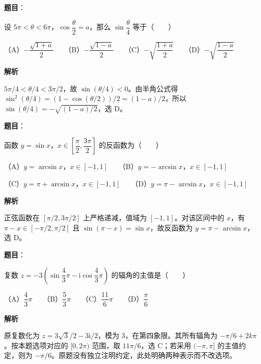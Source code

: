 \begin{answer}

\textbf{题目}：

设 $5\pi<\theta<6\pi$，$\cos\dfrac\theta2=a$，那么 $\sin\dfrac\theta4$ 等于\mbox{（　　）}

（A）$-\dfrac{\sqrt{1+a}}2$　　（B）$-\dfrac{\sqrt{1-a}}2$　　（C）$-\sqrt{\dfrac{1+a}2}$　　（D）$-\sqrt{\dfrac{1-a}2}$

\textbf{解析}

$5\pi/4<\theta/4<3\pi/2$，故 $\sin(\theta/4)<0$。由半角公式得 $\sin^2(\theta/4)=(1-\cos(\theta/2))/2=(1-a)/2$，所以 $\sin(\theta/4)=-\sqrt{(1-a)/2}$，选 D。


\end{answer}
\begin{answer}

\textbf{题目}：

函数 $y=\sin x$，$x\in\left[\dfrac\pi2,\dfrac{3\pi}2\right]$ 的反函数为\mbox{（　　）}

（A）$y=\arcsin x$，$x\in[-1,1]$　　（B）$y=-\arcsin x$，$x\in[-1,1]$

（C）$y=\pi+\arcsin x$，$x\in[-1,1]$　　（D）$y=\pi-\arcsin x$，$x\in[-1,1]$

\textbf{解析}

正弦函数在 $[\pi/2,3\pi/2]$ 上严格递减，值域为 $[-1,1]$。对该区间中的 $x$，有 $\pi-x\in[-\pi/2,\pi/2]$ 且 $\sin(\pi-x)=\sin x$，故反函数为 $y=\pi-\arcsin x$，选 D。


\end{answer}
\begin{answer}

\textbf{题目}：

复数 $z=-3\left(\sin\dfrac43\pi-\mathrm i\cos\dfrac43\pi\right)$ 的辐角的主值是\mbox{（　　）}

（A）$\dfrac43\pi$　　（B）$\dfrac53\pi$　　（C）$\dfrac{11}6\pi$　　（D）$\dfrac\pi6$

\textbf{解析}

原复数化为 $z=3\sqrt3/2-3\mathrm i/2$，模为 3，在第四象限。其所有辐角为 $-\pi/6+2k\pi$。按本题选项对应的 $[0,2\pi)$ 范围，取 $11\pi/6$，选 C；若采用 $(-\pi,\pi]$ 的主值约定，则为 $-\pi/6$。原题没有独立注明约定，此处明确两种表示而不改选项。


\end{answer}
